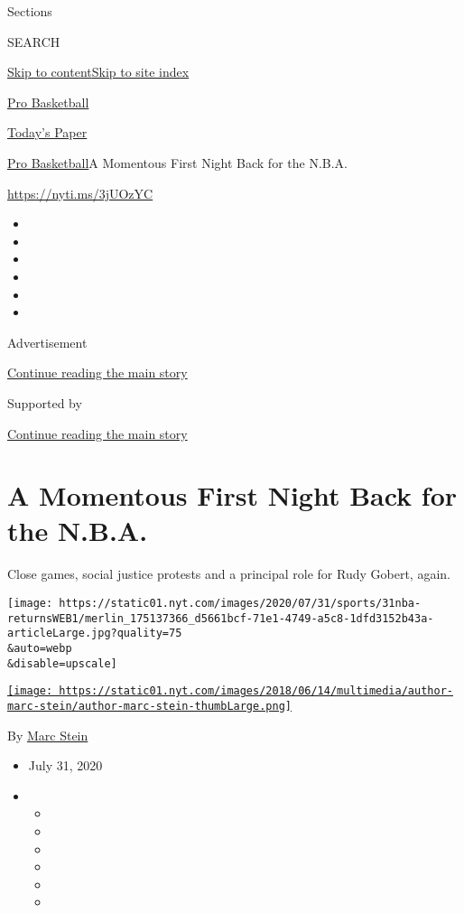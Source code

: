 Sections

SEARCH

\protect\hyperlink{site-content}{Skip to
content}\protect\hyperlink{site-index}{Skip to site index}

\href{https://www.nytimes.com/section/sports/basketball}{Pro Basketball}

\href{https://myaccount.nytimes.com/auth/login?response_type=cookie\&client_id=vi}{}

\href{https://www.nytimes.com/section/todayspaper}{Today's Paper}

\href{/section/sports/basketball}{Pro Basketball}\textbar{}A Momentous
First Night Back for the N.B.A.

\url{https://nyti.ms/3jUOzYC}

\begin{itemize}
\item
\item
\item
\item
\item
\item
\end{itemize}

Advertisement

\protect\hyperlink{after-top}{Continue reading the main story}

Supported by

\protect\hyperlink{after-sponsor}{Continue reading the main story}

\hypertarget{a-momentous-first-night-back-for-the-nba}{%
\section{A Momentous First Night Back for the
N.B.A.}\label{a-momentous-first-night-back-for-the-nba}}

Close games, social justice protests and a principal role for Rudy
Gobert, again.

\texttt{[image: https://static01.nyt.com/images/2020/07/31/sports/31nba-returnsWEB1/merlin\_175137366\_d5661bcf-71e1-4749-a5c8-1dfd3152b43a-articleLarge.jpg?quality=75\\\&auto=webp\\\&disable=upscale]}

\href{https://www.nytimes.com/by/marc-stein}{\texttt{[image: https://static01.nyt.com/images/2018/06/14/multimedia/author-marc-stein/author-marc-stein-thumbLarge.png]}}

By \href{https://www.nytimes.com/by/marc-stein}{Marc Stein}

\begin{itemize}
\item
  July 31, 2020
\item
  \begin{itemize}
  \item
  \item
  \item
  \item
  \item
  \item
  \end{itemize}
\end{itemize}

